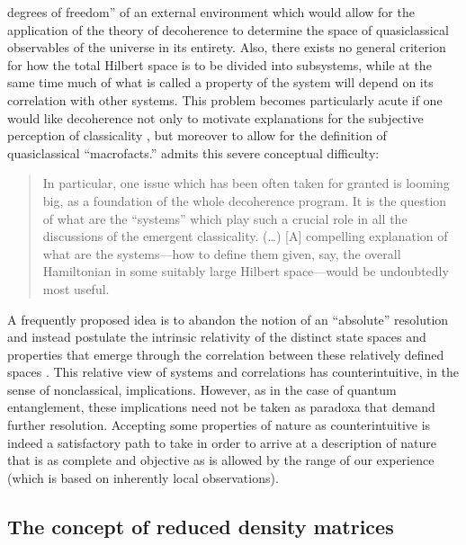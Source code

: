 \documentclass[rmp,aps,amsmath,amsfonts,noshowkeys,noshowpacs,12pt]{revtex4}
\begin{document}
degrees of freedom'' of an external environment which would allow for
the application of the theory of decoherence to determine the space of
quasiclassical observables of the universe in its entirety.  Also,
there exists no general criterion for how the total Hilbert space is
to be divided into subsystems, while at the same time much of what is
called a property of the system will depend on its correlation with
other systems. This problem becomes particularly acute if one would
like decoherence not only to motivate explanations for the subjective
perception of classicality \citep[as in Zurek's ``existential
interpretation,'' see][and Sec.~\ref{sec:everett}
below]{Zurek:1993:pu,Zurek:1998:re,Zurek:2002:ii}, but moreover to
allow for the definition of quasiclassical ``macrofacts.''
\citet[p.~1820]{Zurek:1998:re} admits this severe conceptual
difficulty:
%
\begin{quote} {\small
    In particular, one issue which has been often taken for granted is
    looming big, as a foundation of the whole decoherence program. It
    is the question of what are the ``systems'' which play such a
    crucial role in all the discussions of the emergent classicality.
    (\dots) [A] compelling explanation of what are the
    systems---how to define them given, say, the overall Hamiltonian
    in some suitably large Hilbert space---would be undoubtedly most
    useful.}
\end{quote}
%
A frequently proposed idea is to abandon the notion of an ``absolute''
resolution and instead postulate the intrinsic relativity of the
distinct state spaces and properties that emerge through the
correlation between these relatively defined spaces \citetext{see, for
  example, the proposals, unrelated to decoherence, of
  \citealp{Everett:1957:rw,Mermin:1998:ii,Mermin:1998:wi}; and
  \citealp{Rovelli:1996:rq}}.  This relative view of systems and
correlations has counterintuitive, in the sense of nonclassical,
implications. However, as in the case of quantum entanglement, these
implications need not be taken as paradoxa that demand further
resolution.  Accepting some properties of nature as counterintuitive
is indeed a satisfactory path to take in order to arrive at a
description of nature that is as complete and objective as is allowed
by the range of our experience (which is based on inherently local
observations).


\subsection{The concept of reduced density matrices \label{sec:redmat}}
\end{document}
